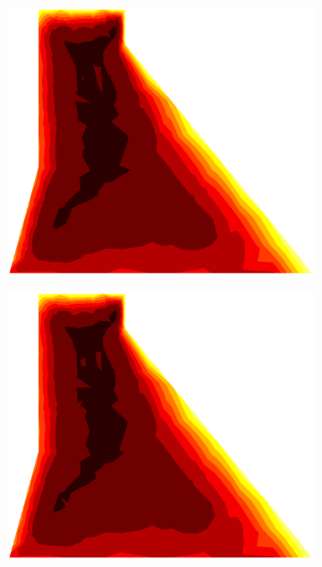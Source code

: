 \documentclass[10pt, a4paper]{article}
\begin{document}
\begin{figure}[H]
\begin{subfigure}[H]{0.19\textwidth}
		\includegraphics[width=1.2\textwidth]{fig/26.eps}
	\end{subfigure}
	\begin{subfigure}[H]{0.19\textwidth}
		\includegraphics[width=1.2\textwidth]{fig/27.eps}
	\end{subfigure}
	\begin{subfigure}[H]{0.19\textwidth}

\end{subfigure}
\end{figure}
\end{document}
